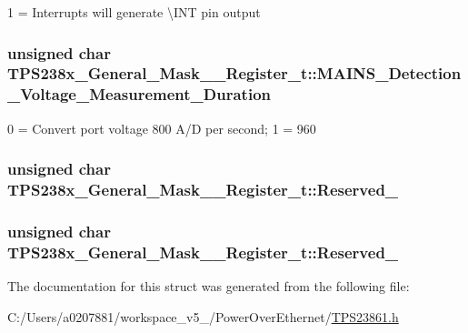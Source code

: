 1 = Interrupts will generate \textbackslash{}I\-N\-T pin output 

\hypertarget{struct_t_p_s238x___general___mask__1___register__t_a4ca38d0397f133021ee0abaeb61d7e66}{
\subsubsection[{M\-A\-I\-N\-S\-\_\-\-Detection\-\_\-\-Voltage\-\_\-\-Measurement\-\_\-\-Duration}]{\setlength{\rightskip}{0pt plus 5cm}unsigned char T\-P\-S238x\-\_\-\-General\-\_\-\-Mask\-\_\-\_\-\-Register\-\_\-t\-::\-M\-A\-I\-N\-S\-\_\-\-Detection\-\_\-\-Voltage\-\_\-\-Measurement\-\_\-\-Duration}}\label{struct_t_p_s238x___general___mask__1___register__t_a4ca38d0397f133021ee0abaeb61d7e66}


0 = Convert port voltage 800 A/\-D per second; 1 = 960 

\hypertarget{struct_t_p_s238x___general___mask__1___register__t_a1bbccb1bbf4b95fd4e19a7679b879ec2}{
\subsubsection[{Reserved\-\_\-5}]{\setlength{\rightskip}{0pt plus 5cm}unsigned char T\-P\-S238x\-\_\-\-General\-\_\-\-Mask\-\_\-\_\-\-Register\-\_\-t\-::\-Reserved\-\_}}\label{struct_t_p_s238x___general___mask__1___register__t_a1bbccb1bbf4b95fd4e19a7679b879ec2}
\hypertarget{struct_t_p_s238x___general___mask__1___register__t_a4e50bf56b68810a410e31cfbb5e82735}{
\subsubsection[{Reserved\-\_\-6}]{\setlength{\rightskip}{0pt plus 5cm}unsigned char T\-P\-S238x\-\_\-\-General\-\_\-\-Mask\-\_\-\_\-\-Register\-\_\-t\-::\-Reserved\-\_}}\label{struct_t_p_s238x___general___mask__1___register__t_a4e50bf56b68810a410e31cfbb5e82735}


The documentation for this struct was generated from the following file\-:\begin{DoxyCompactItemize}
\item 
C\-:/\-Users/a0207881/workspace\-\_\-v5\-\_/\-Power\-Over\-Ethernet/\hyperlink{_t_p_s23861_8h}{T\-P\-S23861.\-h}\end{DoxyCompactItemize}
